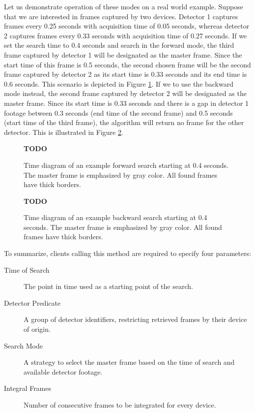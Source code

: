 Let us demonstrate operation of these modes on a real world example. Suppose that we are interested in frames captured by two devices. Detector 1 captures frames every 0.25 seconds with acquisition time of 0.05 seconds, whereas detector 2 captures frames every 0.33 seconds with acquisition time of 0.27 seconds. If we set the search time to 0.4 seconds and search in the forward mode, the third frame captured by detector 1 will be designated as the master frame. Since the start time of this frame is 0.5 seconds, the second chosen frame will be the second frame captured by detector 2 as its start time is 0.33 seconds and its end time is 0.6 seconds. This scenario is depicted in Figure \ref{fig:frame-search-forward}. If we to use the backward mode instead, the second frame captured by detector 2 will be designated as the master frame. Since its start time is 0.33 seconds and there is a gap in detector 1 footage between 0.3 seconds (end time of the second frame) and 0.5 seconds (start time of the third frame), the algorithm will return no frame for the other detector. This is illustrated in Figure \ref{fig:frame-search-backward}.


\begin{figure}[t]
\begin{center}
\textbf{TODO}

\caption{Time diagram of an example forward search starting at 0.4 seconds. The master frame is emphasized by gray color. All found frames have thick borders.}
\label{fig:frame-search-forward}
\end{center}
\end{figure}

\begin{figure}[t]
\begin{center}
\textbf{TODO}

\caption{Time diagram of an example backward search starting at 0.4 seconds. The master frame is emphasized by gray color. All found frames have thick borders.}
\label{fig:frame-search-backward}
\end{center}
\end{figure}

To summarize, clients calling this method are required to specify four parameters:
\begin{description}
	\item[Time of Search]
	The point in time used as a starting point of the search.

	\item[Detector Predicate]
	A group of detector identifiers, restricting retrieved frames by their device of origin.

	\item[Search Mode]
	A strategy to select the master frame based on the time of search and available detector footage.

	\item[Integral Frames]
	Number of consecutive frames to be integrated for every device.
\end{description}

